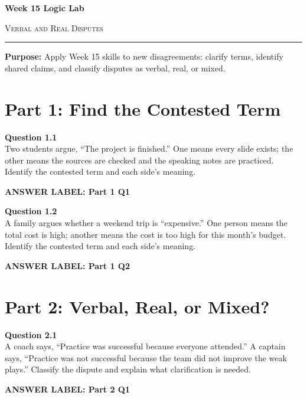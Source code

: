 \documentclass[12pt]{article}
\newcommand{\answerbox}[2]{%
\vspace{0.15em}
\noindent\textbf{#1}\par
\vspace{0.05em}
\noindent\fbox{%
\begin{minipage}[t][#2]{\dimexpr\textwidth-2\fboxsep-2\fboxrule}
\rule{\textwidth}{0pt}
\vspace{#2}
\end{minipage}
}\par
\vspace{0.25em}
}
\begin{document}
\begin{center}
{\LARGE\bfseries Week 15 Logic Lab}\par\vspace{0.05em}
{\large\scshape Verbal and Real Disputes}\par\vspace{0.1em}
\rule{0.78\textwidth}{0.5pt}\par\vspace{0.15em}
\end{center}

\noindent\textbf{Purpose:} Apply Week 15 skills to new disagreements: clarify terms, identify shared claims, and classify disputes as verbal, real, or mixed.

\vspace{0.3em}

\section*{Part 1: Find the Contested Term}

\textbf{Question 1.1}\\[-0.15em]
Two students argue, ``The project is finished.'' One means every slide exists; the other means the sources are checked and the speaking notes are practiced. Identify the contested term and each side's meaning.

\answerbox{ANSWER LABEL: Part 1 Q1}{2.35in}

\textbf{Question 1.2}\\[-0.15em]
A family argues whether a weekend trip is ``expensive.'' One person means the total cost is high; another means the cost is too high for this month's budget. Identify the contested term and each side's meaning.

\answerbox{ANSWER LABEL: Part 1 Q2}{2.35in}

\newpage

\section*{Part 2: Verbal, Real, or Mixed?}

\textbf{Question 2.1}\\[-0.15em]
A coach says, ``Practice was successful because everyone attended.'' A captain says, ``Practice was not successful because the team did not improve the weak plays.'' Classify the dispute and explain what clarification is needed.

\answerbox{ANSWER LABEL: Part 2 Q1}{2.55in}
\end{document}
